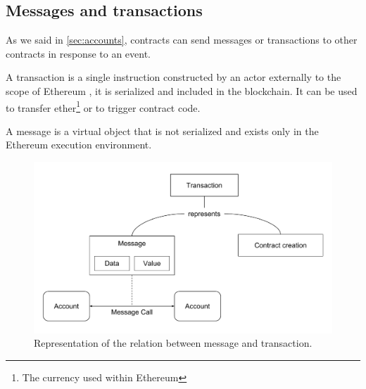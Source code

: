\subsection{Messages and transactions}

As we said in \autoref{sec:accounts}, contracts can send messages or
transactions to other contracts in response to an event.

A transaction is a
single instruction constructed by an actor externally to the scope of Ethereum
\cite{wood2018ethereum}, it is serialized and included in the blockchain. It can
be used to transfer ether\footnote{The currency used within Ethereum} or to
trigger contract code.

A message is a virtual object that is not serialized and
exists only in the Ethereum execution environment.

\begin{figure}[h]
  \centering
  \includegraphics[width=\textwidth]{./res/img/messages-transactions.pdf}
\caption{Representation of the relation between message and transaction.}
\label{fig:messages-transactions}
\end{figure}